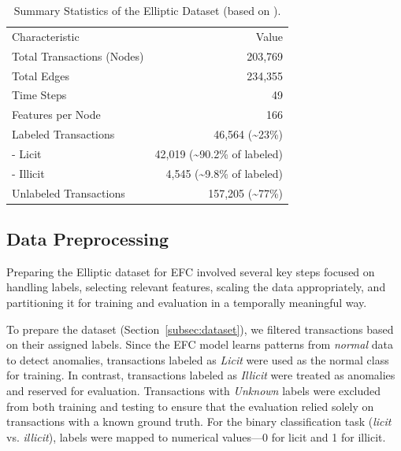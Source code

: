 \documentclass[12pt]{article}
\begin{document}
\begin{table}[htbp]
  \centering
  \caption{Summary Statistics of the Elliptic Dataset (based on \cite{weber2019antimoneylaunderingbitcoinexperimenting}).}
  \label{tab:dataset_summary}
  \begin{tabular}{lr}
    Characteristic        & Value \\
    Total Transactions (Nodes) & 203,769 \\
    Total Edges           & 234,355 \\
    Time Steps            & 49 \\
    Features per Node     & 166 \\
    Labeled Transactions  & 46,564 (\textasciitilde23\%) \\
    \quad - Licit         & 42,019 (\textasciitilde90.2\% of labeled) \\
    \quad - Illicit       & 4,545 (\textasciitilde9.8\% of labeled) \\
    Unlabeled Transactions & 157,205 (\textasciitilde77\%) \\
  \end{tabular}
\end{table}

\subsection{Data Preprocessing} \label{subsec:preprocessing}
Preparing the Elliptic dataset for EFC involved several key steps focused on handling labels, selecting relevant features,
scaling the data appropriately, and partitioning it for training and evaluation in a temporally meaningful way.

To prepare the dataset (Section~\ref{subsec:dataset}), we filtered transactions based on their assigned labels. Since the
EFC model learns patterns from \textit{normal} data to detect anomalies, transactions labeled as \textit{Licit} were used
as the normal class for training. In contrast, transactions labeled as \textit{Illicit} were treated as anomalies and reserved
for evaluation. Transactions with \textit{Unknown} labels were excluded from both training and testing to ensure that the
evaluation relied solely on transactions with a known ground truth. For the binary classification task (\textit{licit} vs. \textit{illicit}),
labels were mapped to numerical values—0 for licit and 1 for illicit.
\end{document}

